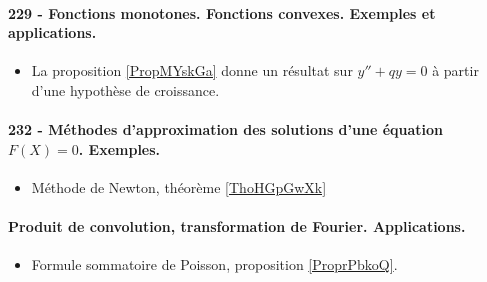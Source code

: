 \paragraph{229 - Fonctions monotones. Fonctions convexes. Exemples et applications.}
\begin{itemize}
    \item La proposition \ref{PropMYskGa} donne un résultat sur \( y''+qy=0\) à partir d'une hypothèse de croissance.
\end{itemize}
\paragraph{232 - Méthodes d'approximation des solutions d’une équation $F (X ) = 0$. Exemples.}
\begin{itemize}
    \item Méthode de Newton, théorème \ref{ThoHGpGwXk}
\end{itemize}
\paragraph{Produit de convolution, transformation de Fourier. Applications.}
\begin{itemize}
    \item Formule sommatoire de Poisson, proposition \ref{ProprPbkoQ}.
\end{itemize}
